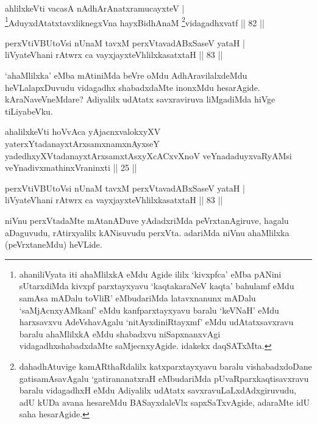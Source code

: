 \begin{shl}
ahlilxkeVti vacasA nA\s \s dhArAnatxramucayxteV |\\
\footnote{ahaniliVyata iti ahaMlilxkA eMdu Agide ililx `kivxpfca' eMba pANini sUtarxdiMda kivxpf parxtayxyavu  `kaqtakaraNeV kaqta' bahulamf eMdu samAsa mADalu toVliR' eMbudariMda latavxnanunx mADalu `saMjAcnxyAMkanf' eMdu kanfparxtayxyavu baralu `keV\s NaH' eMdu harxsavxvu AdeVshavAgalu `nitAyxdiniRtayxmf' eMdu udAtatxsavxravu baralu ahaMlilxkA eMdu shabadxvu niSapxnanxvAgi vidagadhxshabadxdaMte saMjecnxyAgide. idakekx daqSATxMta.}AduyxdAtatxtavxliknegxVna hayxBidhAnaM \footnote{dahadhAtuvige kamARthaRdalilx katxparxtayxyavu baralu vishabadxdoDane gatisamAsavAgalu `gatirananatxraH eMbudariMda pUvaRparxkaqtisavxravu baralu vidagadhxH eMdu Adiyalilx udAtatx savxravuLaLxdAdxgiruvudu, adU kUDa avana hesareMdu BASayxdaleVlx sapxSaTxvAgide, adaraMte idU saha hesarAgide.}vidagadhxvatf \hfill || 82 ||
\end{shl}

\begin{shl}
perxVtiVBUtoV\s si nUnaM tavxM perxVtavadABxSaseV yataH |\\
liVyateV\s hani rAtwrx ca vayxjayxteV\s hlilxkasatxtaH \hfill || 83 ||
\end{shl}

\begin{artha}
`ahaMlilxka' eMba mAtiniMda beVre oMdu AdhAravilalxdeMdu heVLalapxDuvudu vidagadhx shabadxdaMte inonxMdu hesarAgide. kAraNaveVneMdare? Adiyalilx udAtatx savxraviruva liMgadiMda hiVge tiLiyabeVku.
\end{artha}


\begin{kandikeshl}
ahalilxkeVti hoVvAca yAjacnxvalokxyXV yaterxYtadanayxtArxsamxnamxnAyxseY yadedhxyXVtadanayxtArxsamxtAsxyXcACxvXnoV veYnadaduyxvaRyAMsi veYnadivxmathinxVraninxti || 25 ||
\end{kandikeshl}


\begin{shl}
perxVtiVBUtoV\s si nUnaM tavxM perxVtavadABxSaseV yataH |\\
liVyateV\s hani rAtwrx ca vayxjayxteV\s hlilxkasatxtaH \hfill || 83 ||
\end{shl}

\begin{artha}
niVnu perxVtadaMte mAtanADuve yAdadxriMda peVrxtanAgiruve, hagalu aDaguvudu, rAtirxyalilx kANisuvudu perxVta. adariMda niVnu ahaMlilxka (peVrxtaneMdu) heVLide.
\end{artha}

